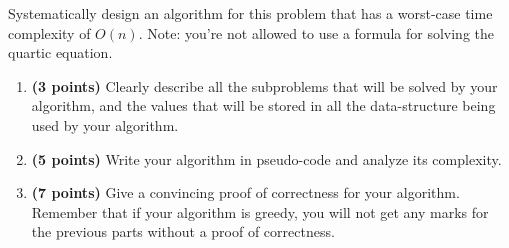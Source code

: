 \documentclass{assignment-373}
\begin{document}
\begin{enumerate}
Systematically design an algorithm for this problem that has a
worst-case time complexity of $O(n).$  Note: you're not allowed to use
a formula for solving the quartic equation.
\begin{enumerate}
\item \textbf{(3 points)} Clearly describe all the subproblems that
  will be solved by your algorithm, and the values that will be stored
  in all the data-structure being used by your algorithm.
\item \textbf{(5 points)} Write your algorithm in pseudo-code and
  analyze its complexity.
\item \textbf{(7 points)} Give a convincing proof of correctness for
  your algorithm. Remember that if your algorithm is greedy, you will
  not get any marks for the previous parts without a proof of correctness.
\end{enumerate}

\end{enumerate}
\end{document}
